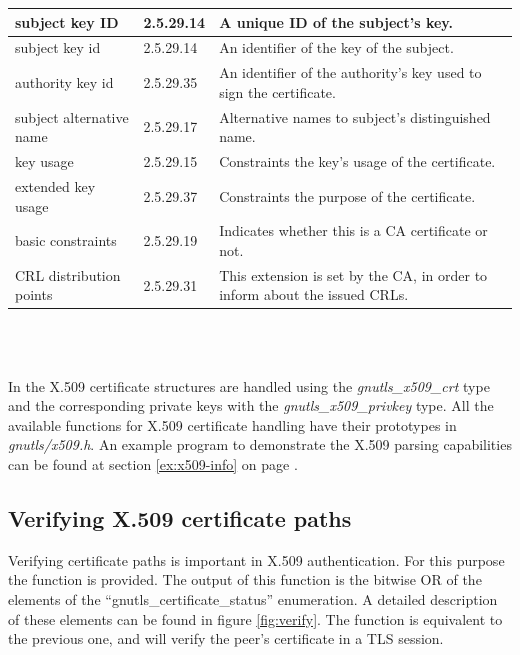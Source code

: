\label{fig:x509_ext}
\begin{tabular}{|l|l|p{6cm}|}
\hline
subject key ID & 2.5.29.14 & A unique ID of the subject's key.
\\
\hline
subject key id & 2.5.29.14 & An identifier of the key of the subject.
\\
\hline
authority key id & 2.5.29.35 & An identifier of the authority's key used to sign the certificate.
\\
\hline
subject alternative name & 2.5.29.17 & Alternative names to subject's distinguished name.
\\
\hline
key usage & 2.5.29.15 & Constraints the key's usage of the certificate.
\\
\hline
extended key usage & 2.5.29.37 & Constraints the purpose of the certificate.
\\
\hline
basic constraints & 2.5.29.19 & Indicates whether this is a CA certificate or not.
\\
\hline
CRL distribution points & 2.5.29.31 & This extension is set by the CA, in order to inform about the issued CRLs.
\\
\hline
\end{tabular}
\\
\\
\par
In \gnutls{} the X.509 certificate structures are handled using the
\emph{gnutls\_x509\_crt} type and the corresponding private keys with
the \emph{gnutls\_x509\_privkey} type.
All the available functions for X.509 certificate handling have their 
prototypes in \emph{gnutls/x509.h}. An example program to demonstrate the 
X.509 parsing capabilities can be found at section \ref{ex:x509-info} on 
page \pageref{ex:x509-info}.

\subsection{Verifying X.509 certificate paths}
Verifying certificate paths is important 
in X.509 authentication. For this purpose the function
 is provided. The
output of this function is the bitwise OR of the elements of the
``gnutls\_certificate\_status'' enumeration. A detailed description of
these elements can be found in figure \ref{fig:verify}.
The function 
is equivalent to the previous one, and will verify the peer's certificate in a TLS session.

